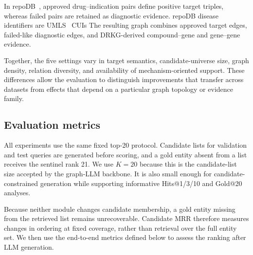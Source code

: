 \documentclass[pdflatex,sn-mathphys-num]{sn-jnl}
\begin{document}
In repoDB~\citep{brown2017standard}, approved drug--indication pairs define positive target triples, whereas failed pairs are retained as diagnostic evidence. repoDB disease identifiers are UMLS~\citep{bodenreider2004unified} CUIs  The resulting graph combines approved target edges, failed-like diagnostic edges, and DRKG-derived compound--gene and gene--gene evidence. 

Together, the five settings vary in target semantics, candidate-universe size, graph density, relation diversity, and availability of mechanism-oriented support. These differences allow the evaluation to distinguish improvements that transfer across datasets from effects that depend on a particular graph topology or evidence family.

\subsection{Evaluation metrics}
\label{sec:evaluation_protocol}

All experiments use the same fixed top-20 protocol. Candidate lists for validation and test queries are generated before scoring, and a gold entity absent from a list receives the sentinel rank 21. We use $K=20$ because this is the candidate-list size accepted by the graph-LLM backbone. It is also small enough for candidate-constrained generation while supporting informative Hits@1/3/10 and Gold@20 analyses.

\begin{revisionblock}Because neither module changes candidate membership, a gold entity missing from the retrieved list remains unrecoverable. Candidate MRR therefore measures changes in ordering at fixed coverage, rather than retrieval over the full entity set. We then use the end-to-end metrics defined below to assess the ranking after LLM generation.\end{revisionblock}
\end{document}
